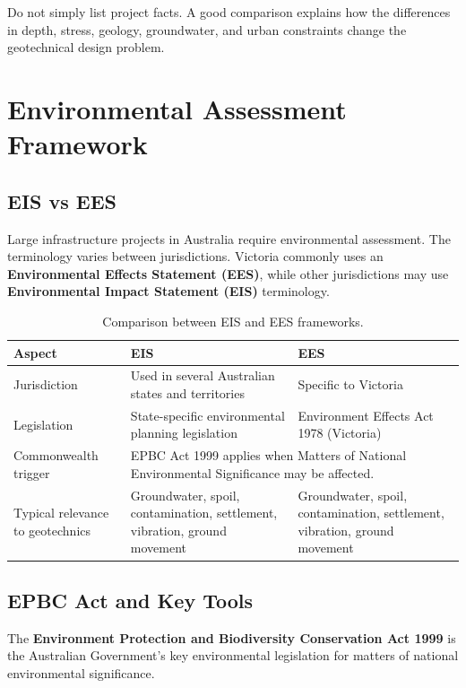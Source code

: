 \documentclass[a4paper,12pt]{article}
\begin{document}
\begin{keybox}
Do not simply list project facts. A good comparison explains how the differences in depth, stress, geology, groundwater, and urban constraints change the geotechnical design problem.
\end{keybox}

\section{Environmental Assessment Framework}

\subsection{EIS vs EES}
Large infrastructure projects in Australia require environmental assessment. The terminology varies between jurisdictions. Victoria commonly uses an \textbf{Environmental Effects Statement (EES)}, while other jurisdictions may use \textbf{Environmental Impact Statement (EIS)} terminology.

\begin{table}[H]
\centering
\small
\begin{tabularx}{\textwidth}{l X X}
\toprule
\textbf{Aspect} & \textbf{EIS} & \textbf{EES} \\
\midrule
Jurisdiction & Used in several Australian states and territories & Specific to Victoria \\
Legislation & State-specific environmental planning legislation & Environment Effects Act 1978 (Victoria) \\
Commonwealth trigger & \multicolumn{2}{X}{EPBC Act 1999 applies when Matters of National Environmental Significance may be affected.} \\
Typical relevance to geotechnics & Groundwater, spoil, contamination, settlement, vibration, ground movement & Groundwater, spoil, contamination, settlement, vibration, ground movement \\
\bottomrule
\end{tabularx}
\caption{Comparison between EIS and EES frameworks.}
\end{table}

\subsection{EPBC Act and Key Tools}
The \textbf{Environment Protection and Biodiversity Conservation Act 1999} is the Australian Government's key environmental legislation for matters of national environmental significance.
\end{document}
